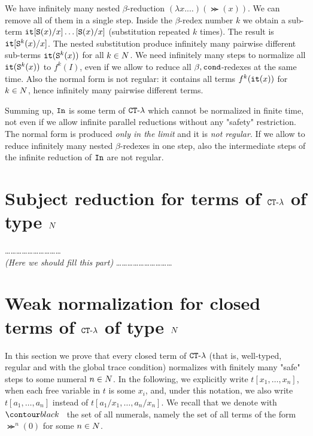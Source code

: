 \documentclass{article}
\begin{document}
We have infinitely many nested $\beta$-reduction $(\lambda x. \ldots)(\Succ (x))$.
We can remove all of them in a single step. Inside the $\beta$-redex number $k$ we obtain a sub-term
${\tt it}[{\tt S} (x)/x]\ldots[{\tt S} (x)/x]$ (substitution repeated $k$ times).
The result is ${\tt it}[{\tt S} ^k(x)/x] $.
The nested substitution produce infinitely many pairwise different sub-terms 
${\tt it}({\tt S} ^k(x))$ for all $k \in {N}$.
We need infinitely many steps to normalize all ${\tt it}({\tt S} ^k(x))$ to $f^k(I)$, 
even if we allow to reduce all $\beta,{\tt cond}$-redexes at the same time.
Also the normal form is not regular: it contains all terms $f^k({\tt it}(x))$ for $k \in {N}$, hence
infinitely many pairwise different terms. 

Summing up, 
${\tt In}$ is some term of ${ {\tt CT} \mbox{-} \lambda}$ which cannot be normalized in finite time, not even if we allow
infinite parallel reductions without any "safety" restriction. 
The normal form is produced \emph{only in the limit}
and it is \emph{not regular}. If we allow to reduce infinitely many nested $\beta$-redexes in one step, also
the intermediate steps of the infinite reduction of ${\tt In}$ are not regular.



\section{Subject reduction for terms of ${ {\tt CT} \mbox{-} \lambda}$ of type ${N}$}
\ldots\ldots\ldots\ldots\ldots\ldots\ldots\ldots\ldots\ldots
\\
\emph{(Here we should fill this part)}
\ldots\ldots\ldots\ldots\ldots\ldots\ldots\ldots\ldots\ldots


\section{Weak normalization for closed terms of ${ {\tt CT} \mbox{-} \lambda}$ of type ${N}$}
\label{section-weak-normalization}
In this section we prove that every closed term of ${ {\tt CT} \mbox{-} \lambda}$
 (that is, well-typed, regular and with the global trace condition) normalizes with finitely many "safe" steps
to some numeral $n \in {N}$.
In the following, we explicitly write $t[x_1,\ldots,x_n]$,
when each free variable in $t$ is some $x_i$, 
and, under this notation, we also write $t[a_1,\ldots,a_n]$ instead of $t[a_1/x_1,\ldots,a_n/x_n]$. 
We recall that we denote with $\Nat$ the set of all numerals, namely the set of all terms of the form
$\Succ^n(0)$ for some $n\in {N}$.
\end{document}
